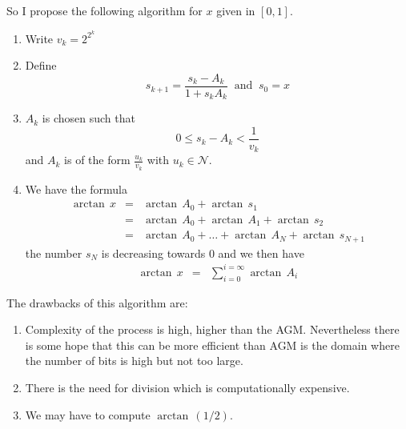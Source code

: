 \documentclass[12pt]{amsart}
\def\N{{\mathcal N}}
\begin{document}
So I propose the following algorithm for $x$ given in $[0,1]$.
\begin{enumerate}
\item Write $v_k=2^{2^k}$
\item Define
\begin{equation*}
s_{k+1}=\frac{s_k-A_k}{1+s_kA_k}\;\;\mbox{and}\;\;s_0=x
\end{equation*}
\item $A_k$ is chosen such that
\begin{equation*}
0\leq s_k-A_k<\frac{1}{v_k}
\end{equation*}
and $A_k$ is of the form $\frac{u_k}{v_k}$ with $u_k\in\N$.
\item We have the formula
\begin{equation*}
\begin{array}{rcl}
\arctan\,x
&=&\arctan\,A_0+\arctan\,s_1\\
&=&\arctan\,A_0+\arctan\,A_1+\arctan\,s_2\\
&=&\arctan\,A_0+\dots+\arctan\,A_N+\arctan\,s_{N+1}
\end{array}
\end{equation*}
the number $s_N$ is decreasing towards $0$ and we then have
\begin{equation*}
\begin{array}{rcl}
\arctan\,x&=&\sum_{i=0}^{i=\infty}\arctan\,A_i
\end{array}
\end{equation*}

\end{enumerate}
The drawbacks of this algorithm are:
\begin{enumerate}
\item Complexity of the process is high, higher than the AGM. Nevertheless there is some hope that this can be more efficient than AGM is the domain where the number of bits is high but not too large.
\item There is the need for division which is computationally expensive.
\item We may have to compute $\arctan\,(1/2)$.
\end{enumerate}
\end{document}
